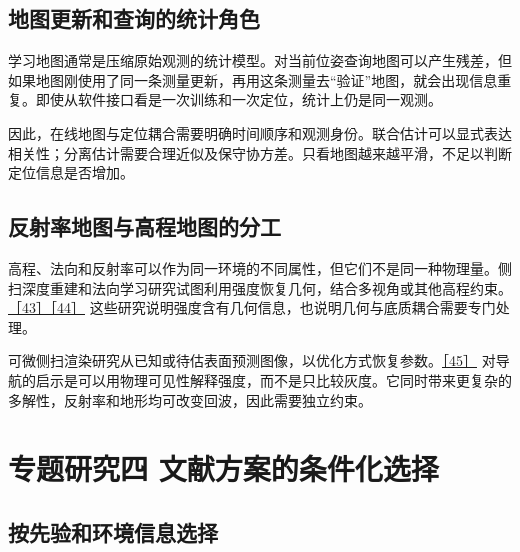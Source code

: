 \hypertarget{ux5730ux56feux66f4ux65b0ux548cux67e5ux8be2ux7684ux7edfux8ba1ux89d2ux8272}{%
\subsection{地图更新和查询的统计角色}\label{ux5730ux56feux66f4ux65b0ux548cux67e5ux8be2ux7684ux7edfux8ba1ux89d2ux8272}}

学习地图通常是压缩原始观测的统计模型。对当前位姿查询地图可以产生残差，但如果地图刚使用了同一条测量更新，再用这条测量去``验证''地图，就会出现信息重复。即使从软件接口看是一次训练和一次定位，统计上仍是同一观测。

因此，在线地图与定位耦合需要明确时间顺序和观测身份。联合估计可以显式表达相关性；分离估计需要合理近似及保守协方差。只看地图越来越平滑，不足以判断定位信息是否增加。

\hypertarget{ux53cdux5c04ux7387ux5730ux56feux4e0eux9ad8ux7a0bux5730ux56feux7684ux5206ux5de5}{%
\subsection{反射率地图与高程地图的分工}\label{ux53cdux5c04ux7387ux5730ux56feux4e0eux9ad8ux7a0bux5730ux56feux7684ux5206ux5de5}}

高程、法向和反射率可以作为同一环境的不同属性，但它们不是同一种物理量。侧扫深度重建和法向学习研究试图利用强度恢复几何，结合多视角或其他高程约束。\href{https://arxiv.org/abs/2206.07810}{［43］}\href{https://arxiv.org/abs/2206.07819}{［44］} 这些研究说明强度含有几何信息，也说明几何与底质耦合需要专门处理。

可微侧扫渲染研究从已知或待估表面预测图像，以优化方式恢复参数。\href{https://arxiv.org/abs/2206.07821}{［45］} 对导航的启示是可以用物理可见性解释强度，而不是只比较灰度。它同时带来更复杂的多解性，反射率和地形均可改变回波，因此需要独立约束。

\hypertarget{ux4e13ux9898ux7814ux7a76ux56db-ux6587ux732eux65b9ux6848ux7684ux6761ux4ef6ux5316ux9009ux62e9}{%
\section{专题研究四 文献方案的条件化选择}\label{ux4e13ux9898ux7814ux7a76ux56db-ux6587ux732eux65b9ux6848ux7684ux6761ux4ef6ux5316ux9009ux62e9}}

\hypertarget{ux6309ux5148ux9a8cux548cux73afux5883ux4fe1ux606fux9009ux62e9}{%
\subsection{按先验和环境信息选择}\label{ux6309ux5148ux9a8cux548cux73afux5883ux4fe1ux606fux9009ux62e9}}

